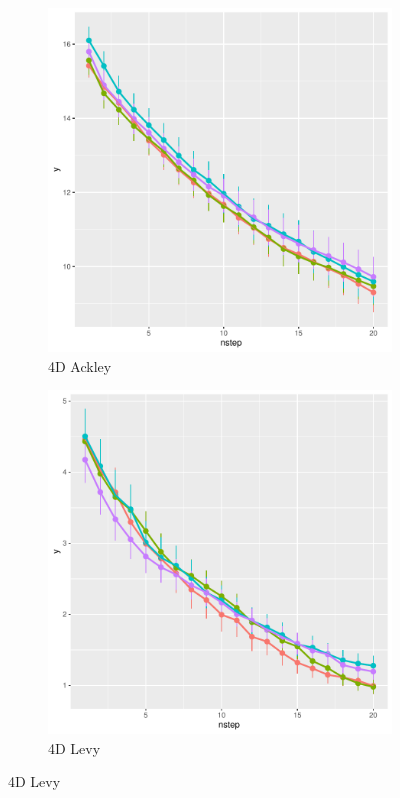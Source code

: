 \documentclass [PhD] {package/uclathes}
\begin{document}
\begin{figure}%
\captionsetup[subfigure]{labelformat=empty}
\centering
\begin{subfigure}[b]{0.3\textwidth}
\centering
\caption{4D Ackley}
\includegraphics[width=\textwidth]{chapters/EGO/pdfs/ackley4_lineplot}
\end{subfigure}
\begin{subfigure}[b]{0.3\textwidth}
\centering
\caption{4D Levy}
\includegraphics[width=\textwidth]{chapters/EGO/pdfs/levy4_lineplot}

\end{subfigure}
\end{figure}
\end{document}
